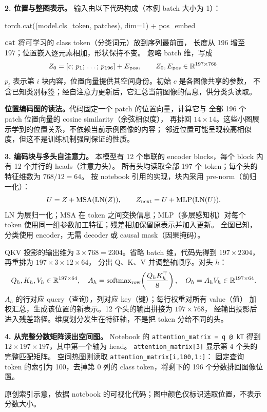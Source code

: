 \textbf{2. 位置与整图表示。}
输入由以下代码构成（本例 batch 大小为 1）：
\begin{center}
\small\ttfamily
torch.cat((model.cls\_token, patches), dim=1) + pos\_embed
\end{center}
\texttt{cat} 将可学习的 class token（分类词元）放到序列最前面，
长度从 196 增至 197；位置嵌入逐元素相加，形状保持不变。
忽略 batch 维，写成
\[
 Z_0=[c;\,p_1;\,\ldots;\,p_{196}]+E_{\rm pos},
 \qquad Z_0,E_{\rm pos}\in\mathbb R^{197\times768}.
\]
$p_i$ 表示第 $i$ 块内容，位置向量提供其空间身份。初始 $c$ 是各图像共享的参数，
不含已知类别标签；经自注意力更新后，它汇总当前图像的信息，供分类头读取。

\textbf{位置编码图的读法。}代码固定一个 patch 的位置向量，计算它与
全部 196 个 patch 位置向量的 cosine similarity（余弦相似度），
再排回 $14\times14$。这些小图展示学到的位置关系，不依赖当前示例图像的内容；
邻近位置可能呈现较高相似度，但这不是训练机制强制保证的性质。

\textbf{3. 编码块与多头自注意力。}
本模型有 12 个串联的 encoder blocks，每个 block 内有 12 个并行的 heads（注意力头）。
所有头均读取全部 197 个 token；每个头的特征维数为 $768/12=64$。
按 notebook 引用的实现，块内采用 pre-norm（前归一化）：
\[
 U=Z+\operatorname{MSA}(\operatorname{LN}(Z)),\qquad
 Z_{\rm next}=U+\operatorname{MLP}(\operatorname{LN}(U)).
\]
LN 为层归一化；MSA 在 token 之间交换信息；MLP（多层感知机）对每个 token
使用同一组参数加工特征；残差相加保留原表示并加入更新。
全图已知，分类使用 encoder，无需 decoder 或 causal mask（因果掩码）。

QKV 投影的输出维为 $3\times768=2304$。省略 batch 维，代码先得到
$197\times2304$，再重排为 $197\times3\times12\times64$，
分出 Q、K、V 并调整轴顺序。对头 $h$：
\[
 Q_h,K_h,V_h\in\mathbb R^{197\times64},\quad
 A_h=\operatorname{softmax}_{\rm row}\!\left(\frac{Q_hK_h^\top}{8}\right),
 \quad O_h=A_hV_h\in\mathbb R^{197\times64}.
\]
$A_h$ 的行对应 query（查询），列对应 key（键）；每行权重对所有 value（值）
加权汇总，生成该位置的新表示。12 个头的输出拼接为 $197\times768$，
经输出投影后进入残差路径。维度划分发生在特征轴，不是把 token 分给不同的头。

\textbf{4. 从完整分数矩阵读出空间图。}
Notebook 的 \texttt{attention\_matrix = q @ kT} 得到
$12\times197\times197$，其中第一个轴为 head。
\texttt{attention\_matrix[3]} 显示第 4 个头的完整匹配矩阵。
空间热图则读取 \texttt{attention\_matrix[i,100,1:]}：
固定查询 token 的索引为 100，去掉第 0 列的 class token，将剩下的 196 个分数排回图像位置。

\begin{center}

\end{center}
{\small 原创索引示意，依据 notebook 的可视化代码；图中颜色仅标识选取位置，不表示分数大小。}

